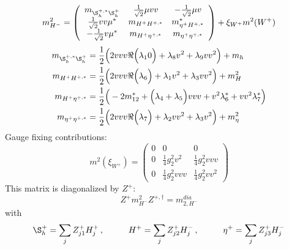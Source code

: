 \begin{itemize}
\begin{equation} 
m^2_{H^-} = \left( 
\begin{array}{ccc}
m_{\S_h^{+,*}\S_h^+} &\frac{1}{\sqrt{2}} \mu vv  &- \frac{1}{\sqrt{2}} \mu v \\ 
\frac{1}{\sqrt{2}} vv \mu^*  &m_{H^+H^{+,*}} &m^*_{\eta^+H^{+,*}}\\ 
- \frac{1}{\sqrt{2}} v \mu^*  &m_{H^+\eta^{+,*}} &m_{\eta^+\eta^{+,*}}\end{array} 
\right) +  \xi_{W^+}m^2(W^+) 
 \end{equation} 
\begin{align} 
m_{\S_h^{+,*}\S_h^+} &= \frac{1}{2} \Big(2 v vv {\Re\Big(\lambda_10\Big)}  + \lambda_8 v^{2}  + \lambda_9 vv^{2} \Big) + m_h\\ 
m_{H^+H^{+,*}} &= \frac{1}{2} \Big(2 v vv {\Re\Big(\lambda_6\Big)}  + \lambda_1 v^{2}  + \lambda_3 vv^{2} \Big) + m_H^2\\ 
m_{H^+\eta^{+,*}} &= \frac{1}{2} \Big(-2 m_{12}^*  + \Big(\lambda_4 + \lambda_5\Big)v vv  + v^{2} \lambda_6^*  + vv^{2} \lambda_7^* \Big)\\ 
m_{\eta^+\eta^{+,*}} &= \frac{1}{2} \Big(2 v vv {\Re\Big(\lambda_7\Big)}  + \lambda_2 vv^{2}  + \lambda_3 v^{2} \Big) + m_\eta^2
\end{align} 
Gauge fixing contributions: 
\begin{equation} 
m^2 (\xi_{W^+}) = \left( 
\begin{array}{ccc}
0 &0 &0\\ 
0 &\frac{1}{4} g_{2}^{2} v^{2}  &\frac{1}{4} g_{2}^{2} v vv \\ 
0 &\frac{1}{4} g_{2}^{2} v vv  &\frac{1}{4} g_{2}^{2} vv^{2} \end{array} 
\right) 
 \end{equation} 
This matrix is diagonalized by \(Z^+\): 
\begin{equation} 
Z^+ m^2_{H^-} Z^{+,\dagger} = m^{dia}_{2,H^-} 
\end{equation} 
with 
\begin{align} 
\S_h^+ = \sum_{j}Z_{{j 1}}^{+}H^+_{{j}}\,, \hspace{1cm} 
H^+ = \sum_{j}Z_{{j 2}}^{+}H^-_{{j}}\,, \hspace{1cm} 
\eta^+ = \sum_{j}Z_{{j 3}}^{+}H^-_{{j}}
\end{align} 
\end{itemize} 
